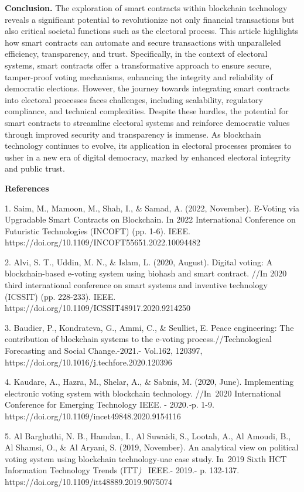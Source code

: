 {\bfseries Conclusion.} The exploration of smart contracts within
blockchain technology reveals a significant potential to revolutionize
not only financial transactions but also critical societal functions
such as the electoral process. This article highlights how smart
contracts can automate and secure transactions with unparalleled
efficiency, transparency, and trust. Specifically, in the context of
electoral systems, smart contracts offer a transformative approach to
ensure secure, tamper-proof voting mechanisms, enhancing the integrity
and reliability of democratic elections. However, the journey towards
integrating smart contracts into electoral processes faces challenges,
including scalability, regulatory compliance, and technical
complexities. Despite these hurdles, the potential for smart contracts
to streamline electoral systems and reinforce democratic values through
improved security and transparency is immense. As blockchain technology
continues to evolve, its application in electoral processes promises to
usher in a new era of digital democracy, marked by enhanced electoral
integrity and public trust.

{\bfseries References}

1. Saim, M., Mamoon, M., Shah, I., \& Samad, A. (2022, November).
E-Voting via Upgradable Smart Contracts on Blockchain. In 2022
International Conference on Futuristic Technologies (INCOFT) (pp. 1-6).
IEEE. https://doi.org/10.1109/INCOFT55651.2022.10094482

2. Alvi, S. T., Uddin, M. N., \& Islam, L. (2020, August). Digital
voting: A blockchain-based e-voting system using biohash and smart
contract. //In 2020 third international conference on smart systems and
inventive technology (ICSSIT) (pp. 228-233). IEEE.
https://doi.org/10.1109/ICSSIT48917.2020.9214250

3. Baudier, P., Kondrateva, G., Ammi, C., \& Seulliet, E. Peace
engineering: The contribution of blockchain systems to the e-voting
process.//Technological Forecasting and Social Change.-2021.- Vol.162,
120397, https://doi.org/10.1016/j.techfore.2020.120396

4. Kaudare, A., Hazra, M., Shelar, A., \& Sabnis, M. (2020, June).
Implementing electronic voting system with blockchain technology.
//In~2020 International Conference for Emerging Technology IEEE. -
2020\emph{.-}p. 1-9. https://doi.org/10.1109/incet49848.2020.9154116

5. Al Barghuthi, N. B., Hamdan, I., Al Suwaidi, S., Lootah, A., Al
Amoudi, B., Al Shamsi, O., \& Al Aryani, S. (2019, November). An
analytical view on political voting system using blockchain
technology-uae case study. In~2019 Sixth HCT Information Technology
Trends (ITT\emph{)}~ IEEE.- 2019.- p. 132-137.
https://doi.org/10.1109/itt48889.2019.9075074

